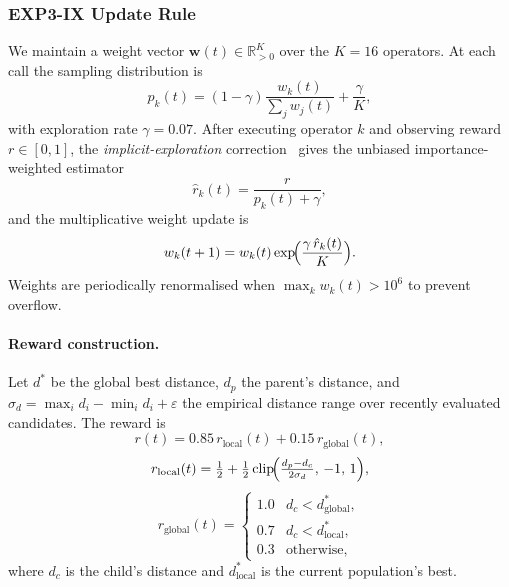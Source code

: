 \documentclass{article}
\newcommand{\wb}{\mathbf{w}}
\newcommand{\R}{\mathbb{R}}
\newcommand{\clip}{\mathrm{clip}}
\begin{document}
\subsubsection{EXP3-IX Update Rule}

We maintain a weight vector $\wb(t)\in\R_{>0}^K$ over the $K=16$
operators.  At each call the sampling distribution is
\begin{equation}
  p_k(t)
  = (1-\gamma)\frac{w_k(t)}{\sum_j w_j(t)} + \frac{\gamma}{K},
  \label{eq:exp3_probs}
\end{equation}
with exploration rate $\gamma=0.07$.  After executing operator $k$ and
observing reward $r\in[0,1]$, the \emph{implicit-exploration}
correction~\citep{neu2015explore} gives the unbiased importance-weighted
estimator
\begin{equation}
  \hat{r}_k(t) = \frac{r}{p_k(t) + \gamma},
  \label{eq:ix_est}
\end{equation}
and the multiplicative weight update is
\begin{equation}
  w_k(t+1)
  = w_k(t)\exp\!\Bigl(\frac{\gamma\,\hat{r}_k(t)}{K}\Bigr).
  \label{eq:exp3_update}
\end{equation}
Weights are periodically renormalised when $\max_k w_k(t)>10^6$ to
prevent overflow.

\paragraph{Reward construction.}
Let $d^*$ be the global best distance, $d_p$ the parent's distance, and
$\sigma_d = \max_i d_i - \min_i d_i + \varepsilon$ the empirical
distance range over recently evaluated candidates.  The reward is
\begin{equation}
  r(t) = 0.85\, r_{\mathrm{local}}(t) + 0.15\, r_{\mathrm{global}}(t),
  \label{eq:reward}
\end{equation}
\begin{equation}
  r_{\mathrm{local}}(t)
  = \tfrac{1}{2} + \tfrac{1}{2}\,
  \clip\!\Bigl(\tfrac{d_p - d_c}{2\sigma_d},\,-1,\,1\Bigr),
  \label{eq:reward_local}
\end{equation}
\begin{equation}
  r_{\mathrm{global}}(t)
  = \begin{cases}
      1.0 & d_c < d^*_{\mathrm{global}}, \\
      0.7 & d_c < d^*_{\mathrm{local}}, \\
      0.3 & \text{otherwise,}
    \end{cases}
  \label{eq:reward_global}
\end{equation}
where $d_c$ is the child's distance and $d^*_{\mathrm{local}}$ is the
current population's best.
\end{document}
